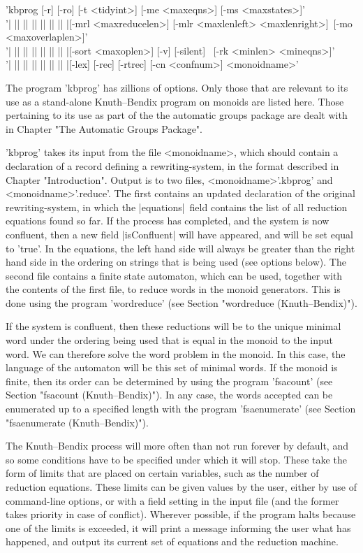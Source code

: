 
'kbprog  [-r] [-ro] [-t <tidyint>] [-me <maxeqns>] [-ms <maxstates>]'\\
'| || || || || || || |[-mrl <maxreducelen>] [-mlr <maxlenleft> <maxlenright>]\
[-mo <maxoverlaplen>]'\\
'| || || || || || || |[-sort <maxoplen>] [-v] [-silent] \
[-rk <minlen> <mineqns>]'\\
'| || || || || || || |[-lex] [-rec] [-rtrec] [-cn <confnum>] <monoidname>'

The program 'kbprog' has zillions of options. Only those that are relevant
to its use as a stand-alone Knuth--Bendix program on monoids are listed here.
Those pertaining to its use as part of the the automatic groups package are
dealt with in Chapter "The Automatic Groups Package".

'kbprog' takes its input from the file <monoidname>, which should contain a
declaration of a record defining a rewriting-system, in the format described
in Chapter "Introduction". Output is to two files, <monoidname>'.kbprog' and
<monoidname>'.reduce'. The first contains an updated declaration of the
original rewriting-system, in which the |equations|\ field contains the
list of all reduction equations found so far. If the process has completed,
and the system is now confluent, then a new field |isConfluent| will
have appeared, and will be set equal to 'true'. In the equations,
the left hand side will always be greater than the right hand side in the
ordering on strings that is being used (see options below).
The second file contains a finite state automaton,
which can be used, together with the contents of the first file,
to reduce words in the monoid generators. This is done using the
program 'wordreduce' (see Section "wordreduce (Knuth--Bendix)").

If the system is confluent, then these reductions will be to the unique
minimal word under the ordering being used that is equal in the monoid to the
input word. We can therefore solve the word problem in the monoid. In this
case, the language of the automaton will be this set of minimal words.
If the monoid is finite, then its order can be determined by using the
program 'fsacount' (see Section "fsacount (Knuth--Bendix)").
In any case, the words accepted
can be enumerated up to a specified length with the program 'fsaenumerate'
(see Section "fsaenumerate (Knuth--Bendix)").

The Knuth--Bendix process will more often than not run forever by default,
and so some conditions have to be specified under which it will stop.
These take the form of limits that are placed on certain variables,
such as the number of reduction equations. 
These limits can be given values by the user, either by use of command-line
options, or with a field setting in the input file
(and the former takes priority in case of conflict).
Wherever possible, if the program halts because one of the limits is exceeded,
it will print a message informing the user what has happened,
and output its current set of equations and the reduction machine.

